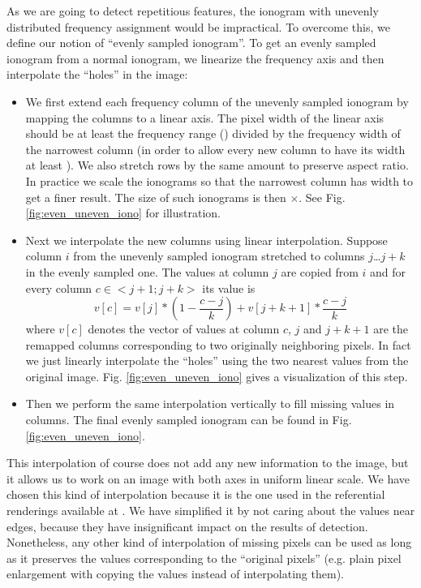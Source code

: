 As we are going to detect repetitious features, the ionogram with unevenly distributed frequency assignment would be impractical. To overcome this, we define our notion of ``evenly sampled ionogram''. To get an evenly sampled ionogram from a normal ionogram, we linearize the frequency axis and then interpolate the ``holes'' in the image:

\begin{itemize}
  \item We first extend each frequency column of the unevenly sampled ionogram by mapping the columns to a linear axis. The pixel width of the linear axis should be at least the frequency range () divided by the frequency width of the narrowest column (in order to allow every new column to have its width at least ). We also stretch rows by the same amount to preserve aspect ratio. In practice we scale the ionograms so that the narrowest column has width  to get a finer result. The size of such ionograms is then $\times$. See Fig. \ref{fig:even_uneven_iono} for illustration.
  \item Next we interpolate the new columns using linear interpolation. Suppose column $i$ from the unevenly sampled ionogram stretched to columns $j$\ldots$j+k$ in the evenly sampled one. The values at column $j$ are copied from $i$ and for every column $c\in<j+1; j+k>$ its value is $$v[c] = v[j]*(1-\frac{c-j}{k}) + v[j+k+1]*\frac{c-j}{k}$$ where $v[c]$ denotes the vector of values at column $c$, $j$ and $j+k+1$ are the remapped columns corresponding to two originally neighboring pixels. In fact we just linearly interpolate the ``holes'' using the two nearest values from the original image. Fig. \ref{fig:even_uneven_iono} gives a visualization of this step. 
  \item Then we perform the same interpolation vertically to fill missing values in columns. The final evenly sampled ionogram can be found in Fig. \ref{fig:even_uneven_iono}.
\end{itemize}

This interpolation of course does not add any new information to the image, but it allows us to work on an image with both axes in uniform linear scale. We have chosen this kind of interpolation because it is the one used in the referential renderings available at \citep{FTP}. We have simplified it by not caring about the values near edges, because they have insignificant impact on the results of detection. Nonetheless, any other kind of interpolation of missing pixels can be used as long as it preserves the values corresponding to the ``original pixels'' (e.g. plain pixel enlargement with copying the values instead of interpolating them).

